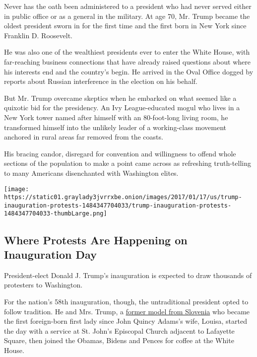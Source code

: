 Never has the oath been administered to a president who had never served
either in public office or as a general in the military. At age 70, Mr.
Trump became the oldest president sworn in for the first time and the
first born in New York since Franklin D. Roosevelt.

He was also one of the wealthiest presidents ever to enter the White
House, with far-reaching business connections that have already raised
questions about where his interests end and the country's begin. He
arrived in the Oval Office dogged by reports about Russian interference
in the election on his behalf.

But Mr. Trump overcame skeptics when he embarked on what seemed like a
quixotic bid for the presidency. An Ivy League-educated mogul who lives
in a New York tower named after himself with an 80-foot-long living
room, he transformed himself into the unlikely leader of a working-class
movement anchored in rural areas far removed from the coasts.

His bracing candor, disregard for convention and willingness to offend
whole sections of the population to make a point came across as
refreshing truth-telling to many Americans disenchanted with Washington
elites.

\href{https://www.nytimes3xbfgragh.onion/interactive/2017/01/17/us/inauguration-protests.html}{}

\texttt{[image: https://static01.graylady3jvrrxbe.onion/images/2017/01/17/us/trump-inauguration-protests-1484347704033/trump-inauguration-protests-1484347704033-thumbLarge.png]}

\hypertarget{where-protests-are-happening-on-inauguration-day}{%
\subsection{Where Protests Are Happening on Inauguration
Day}\label{where-protests-are-happening-on-inauguration-day}}

President-elect Donald J. Trump's inauguration is expected to draw
thousands of protesters to Washington.

For the nation's 58th inauguration, though, the untraditional president
opted to follow tradition. He and Mrs. Trump, a
\href{https://www.nytimes3xbfgragh.onion/2016/07/19/us/politics/melania-trump-slovenia.html}{former
model from Slovenia} who became the first foreign-born first lady since
John Quincy Adams's wife, Louisa, started the day with a service at St.
John's Episcopal Church adjacent to Lafayette Square, then joined the
Obamas, Bidens and Pences for coffee at the White House.

